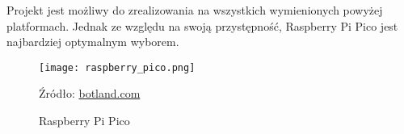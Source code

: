             Projekt jest możliwy do zrealizowania na wszystkich wymienionych powyżej platformach.
            Jednak ze względu na swoją przystępność, Raspberry Pi Pico jest najbardziej optymalnym wyborem.
            \begin{figure}[!ht]
                \centering
                \texttt{[image: raspberry\_pico.png]}
                \caption{Raspberry Pi Pico}
                Źródło: \href{https://botland.com.pl/moduly-i-zestawy-do-raspberry-pi-pico/21574-raspberry-pi-pico-w-rp2040-arm-cortex-m0-cyw43439-wifi-5056561803173.html}{botland.com}

                \label{fig:raspberry_pico}
            \end{figure}

